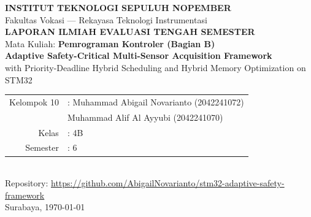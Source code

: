 \documentclass[12pt,a4paper]{article}
\begin{document}
\begin{titlepage}
    \centering
    \vspace*{0.8cm}
    {\Large \textbf{INSTITUT TEKNOLOGI SEPULUH NOPEMBER}}\\[0.3em]
    {\large Fakultas Vokasi --- Rekayasa Teknologi Instrumentasi}\\[1.8cm]

    {\huge \textbf{LAPORAN ILMIAH EVALUASI TENGAH SEMESTER}}\\[0.4em]
    {\Large Mata Kuliah: \textbf{Pemrograman Kontroler (Bagian B)}}\\[1.2em]

    {\large \textbf{Adaptive Safety-Critical Multi-Sensor Acquisition Framework}}\\[0.3em]
    {\large with Priority-Deadline Hybrid Scheduling and Hybrid Memory Optimization on STM32}\\[1.5em]

    \begin{tabular}{rl}
        Kelompok 10 & : Muhammad Abigail Novarianto (2042241072) \\
                    & \hspace{2.1cm} Muhammad Alif Al Ayyubi (2042241070) \\
        Kelas       & : 4B \\
        Semester    & : 6 \\
    \end{tabular}\\[1.5em]

    {\normalsize Repository: \url{https://github.com/AbigailNovarianto/stm32-adaptive-safety-framework}}\\[2cm]
    {\large Surabaya, \today}
\end{titlepage}

\begin{abstract}
\noindent
Laporan ini mendokumentasikan sintesis dan implementasi \textit{framework} embedded \textit{safety-critical} pada STM32F401VE (simulasi Proteus) dengan FreeRTOS. Studi literatur mencakup 16 jurnal Scopus/Web of Science (2021--2026); \textit{future work} (FW1--FW16) disintesis menjadi metode terpadu: akuisisi ADC+DMA adaptif, penjadwalan empat \textit{task} prioritas-deadline, penempatan buffer kritis (CCM pada F407; SRAM prioritas tinggi pada F401), serta pemantauan CBF disederhanakan + WWDG + FSM NORMAL--WARNING--FAULT. Pengujian fungsional memverifikasi kontrol PWM 10\,kHz, logging UART CSV, dan \textit{fail-safe} saat sensor keluar batas 200--2800\,mV.

\vspace{0.4em}
\noindent\textbf{Kata kunci:} STM32, FreeRTOS, ADC adaptif, safety-critical, Proteus, embedded system.
\end{abstract}
\end{document}
